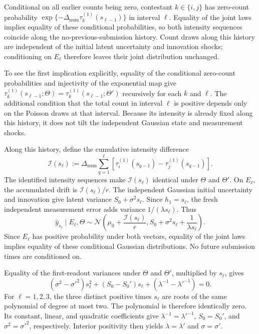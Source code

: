 \documentclass[mnsc]{informs3}
\begin{document}
\begin{APPENDICES}
{Conditional on all earlier counts being zero, contestant $k\in\{i,j\}$ has zero-count probability $\exp\{-\Delta_{\mathrm{num}}\tau_k^{(1)}(s_{\ell-1})\}$ in interval $\ell$. Equality of the joint laws implies equality of these conditional probabilities, so both intensity sequences coincide along the no-previous-submission history. Count draws along this history are independent of the initial latent uncertainty and innovation shocks; conditioning on $E_\ell$ therefore leaves their joint distribution unchanged.

To see the first implication explicitly, equality of the conditional
zero-count probabilities and injectivity of the exponential map give
$\tau_k^{(1)}(s_{\ell-1};\Theta)
=\tau_k^{(1)}(s_{\ell-1};\Theta')$ recursively for each $k$ and $\ell$.
The additional condition that the total count in interval $\ell$ is
positive depends only on the Poisson draws at that interval. Because its
intensity is already fixed along this history, it does not tilt the
independent Gaussian state and measurement shocks.

Along this history, define the cumulative intensity difference
\begin{equation}\label{eq-local-id-A}
{\mathscr I}(s_\ell):=\Delta_{\mathrm{num}}\sum_{q=1}^{\ell}
\left[\tau_i^{(1)}(s_{q-1})-\tau_j^{(1)}(s_{q-1})\right].
\end{equation}
The identified intensity sequences make ${\mathscr I}(s_\ell)$ identical under $\Theta$ and $\Theta'$.
On $E_\ell$, the accumulated drift is ${\mathscr I}(s_\ell)/r$. The independent Gaussian initial uncertainty and innovation give latent variance $S_0+\sigma^2s_\ell$. Since $h_1=s_\ell$, the fresh independent measurement error adds variance $1/(\lambda s_\ell)$. Thus
\begin{equation}\label{eq-local-id-conditional-law}
\hat y_{s_\ell}\mid E_\ell,\Theta
\sim\mathcal N\!\left(
\mu_0+\frac{{\mathscr I}(s_\ell)}r,
S_0+\sigma^2s_\ell+\frac{1}{\lambda s_\ell}
\right).
\end{equation}
Since $E_\ell$ has positive probability under both vectors, equality of the joint laws implies equality of these conditional Gaussian distributions. No future submission times are conditioned on.

Equality of the first-readout variances under $\Theta$ and $\Theta'$, multiplied by $s_\ell$, gives
\[
(\sigma^2-\sigma'^2)s_\ell^2
+(S_0-S_0')s_\ell
+\left(\lambda^{-1}-\lambda'^{-1}\right)=0.
\]
For $\ell=1,2,3$, the three distinct positive times $s_\ell$ are roots
of the same polynomial of degree at most two. The polynomial is therefore
identically zero. Its constant, linear, and quadratic coefficients give
$\lambda^{-1}=\lambda'^{-1}$, $S_0=S_0'$, and
$\sigma^2=\sigma'^2$, respectively. Interior positivity then yields
$\lambda=\lambda'$ and $\sigma=\sigma'$.

}
\end{APPENDICES}
\end{document}
